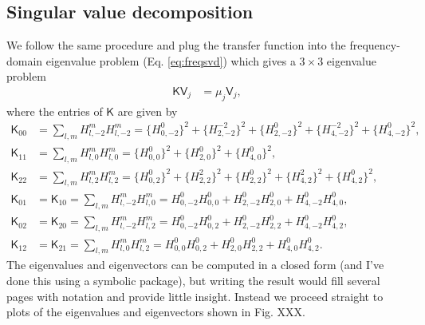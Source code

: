 \documentclass[11pt]{article}
\begin{document}
\subsection{Singular value decomposition}
We follow the same procedure and plug the transfer function into the
frequency-domain eigenvalue problem (Eq. \ref{eq:freqsvd}) which gives a
$3\times 3$ eigenvalue problem
\begin{align}
  \mathsf{K}\mathsf{V}_j &= \mu_{j}\mathsf{V}_j,
\end{align}
where the entries of $\mathsf{K}$ are given by
\begin{align}
  \mathsf{K}_{00} &= \sum_{l,m}H_{l,-2}^{m}H_{l,-2}^{m} = \{H_{0,-2}^{0}\}^2 + \{H_{2,-2}^{-2}\}^2 + \{H_{2,-2}^{0}\}^2 + \{H_{4,-2}^{-2}\}^2 + \{H_{4,-2}^{0}\}^2,\\
  \mathsf{K}_{11} &= \sum_{l,m}H_{l,0}^{m}H_{l,0}^{m} = \{H_{0,0}^{0}\}^2 + \{H_{2,0}^{0}\}^2 + \{H_{4,0}^{0}\}^2,\\
  \mathsf{K}_{22} &= \sum_{l,m}H_{l,2}^{m}H_{l,2}^{m} = \{H_{0,2}^{0}\}^2 + \{H_{2,2}^{2}\}^2 + \{H_{2,2}^{0}\}^2 + \{H_{4,2}^{2}\}^2 + \{H_{4,2}^{0}\}^2,\\
  \mathsf{K}_{01} &= \mathsf{K}_{10} = \sum_{l,m}H_{l,-2}^{m}H_{l,0}^{m} = H_{0,-2}^{0}H_{0,0}^{0} + H_{2,-2}^{0}H_{2,0}^{0} + H_{4,-2}^{0}H_{4,0}^{0},\\
  \mathsf{K}_{02} &= \mathsf{K}_{20} = \sum_{l,m}H_{l,-2}^{m}H_{l,2}^{m} = H_{0,-2}^{0}H_{0,2}^{0} + H_{2,-2}^{0}H_{2,2}^{0} + H_{4,-2}^{0}H_{4,2}^{0},\\
  \mathsf{K}_{12} &= \mathsf{K}_{21} = \sum_{l,m}H_{l,0}^{m}H_{l,2}^{m} = H_{0,0}^{0}H_{0,2}^{0} + H_{2,0}^{0}H_{2,2}^{0} + H_{4,0}^{0}H_{4,2}^{0}.
\end{align}
The eigenvalues and eigenvectors can be computed in a closed form (and I've done
this using a symbolic package), but writing the result would fill several pages
with notation and provide little insight. Instead we proceed straight to plots
of the eigenvalues and eigenvectors shown in Fig. XXX. 

{}



\appendix
\end{document}

